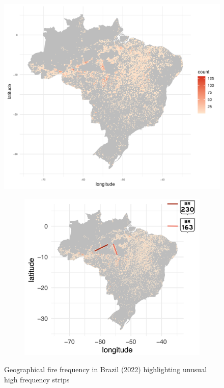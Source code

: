 \documentclass{article}\usepackage[]{graphicx}\usepackage[]{xcolor}
\makeatletter
\def\maxwidth{ %
  \ifdim\Gin@nat@width>\linewidth
    \linewidth
  \else
    \Gin@nat@width
  \fi
}
\newenvironment{knitrout}{}{} %
\numberwithin{equation}{section}
\makeatother
\begin{document}
\begin{figure}[htbp]
  \centering
  \begin{minipage}[b]{0.48\linewidth}
\begin{knitrout}\scriptsize
{}\color{fgcolor}

{\centering \includegraphics[width=\maxwidth]{figure/beamer-spacetime-fy22-1} 

}


\end{knitrout}
  \end{minipage}
  \hfill
  \begin{minipage}[b]{0.48\linewidth}
\begin{figure}[H]
    \centering
    \includegraphics[width=1\linewidth]{image_reference/mapshoot.png}
\end{figure}
  \end{minipage}
  \caption{Geographical fire frequency in Brazil (2022) highlighting unusual high frequency strips}
  \label{fig:fire22}
\end{figure}
\end{document}
